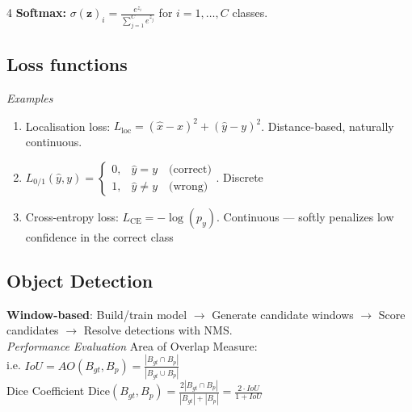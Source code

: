 \documentclass[10pt]{extarticle}
\begin{document}
\begin{multicols}{4}
\textbf{Softmax:} $\sigma(\mathbf{z})_i = \frac{e^{z_i}}{\sum_{j=1}^{C} e^{z_j}}$ for $i = 1, \dots, C$ classes. \\

\subsection{Loss functions}
\begin{center}
\end{center}
\vspace{-1.5em}

\textit{Examples}
\begin{enumerate}
    \item Localisation loss: $L_{\text{loc}} = (\hat{x}-x)^2 + (\hat{y}-y)^2$. Distance-based, naturally continuous.
    \item $L_{0/1}(\hat{y}, y) =
        \begin{cases}
        0, & \hat{y} = y \quad \text{(correct)} \\
        1, & \hat{y} \neq y \quad \text{(wrong)}
        \end{cases}
    $. Discrete
    \item Cross-entropy loss: $L_{\text{CE}} = -\log(p_y)$. Continuous — softly penalizes low confidence in the correct class
\end{enumerate}

\subsection{Object Detection}
\textbf{Window-based}: \quad Build/train model $\rightarrow$ Generate candidate windows $\rightarrow$ Score candidates $\rightarrow$ Resolve detections with NMS. \\
\textit{Performance Evaluation} Area of Overlap Measure:\\ i.e. $IoU=AO(B_{gt}, B_p) = \frac{|B_{gt} \cap B_p|}{|B_{gt} \cup B_p|}$ \\
Dice Coefficient $\text{Dice}(B_{gt}, B_p) = \frac{2|B_{gt} \cap B_p|}{|B_{gt}| + |B_p|} = \frac{2 \cdot IoU}{1 + IoU}$


\end{multicols}
\end{document}
